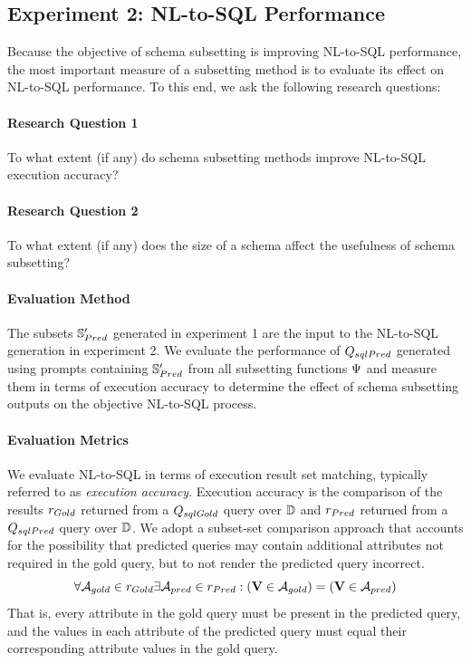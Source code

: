 \subsection{Experiment 2: NL-to-SQL Performance}

Because the objective of schema subsetting is improving NL-to-SQL performance, the most important measure of a subsetting method is to evaluate its effect on NL-to-SQL performance.
To this end, we ask the following research questions:

\paragraph{\textbf{Research Question 1}} To what extent (if any) do schema subsetting methods improve NL-to-SQL execution accuracy?

\paragraph{\textbf{Research Question 2}} To what extent (if any) does the size of a schema affect the usefulness of schema subsetting? 

\paragraph{\textbf{Evaluation Method}}
The subsets $\mathbb{S}'_{Pred}$ generated in experiment 1 are the input to the NL-to-SQL generation in experiment 2.
We evaluate the performance of $Q_{sqlPred}$ generated using prompts containing $\mathbb{S}'_{Pred}$ from all subsetting functions $\Psi$ and measure them in terms of execution accuracy to determine the effect of schema subsetting outputs on the objective NL-to-SQL process.

\paragraph{\textbf{Evaluation Metrics}} 

We evaluate NL-to-SQL in terms of execution result set matching, typically referred to as \emph{execution accuracy}.
Execution accuracy is the comparison of the results $r_{Gold}$ returned from a $Q_{sqlGold}$ query over $\mathbb{D}$ and $r_{Pred}$ returned from a $Q_{sqlPred}$ query over $\mathbb{D}$.
We adopt a subset-set comparison approach that accounts for the possibility that predicted queries may contain additional attributes not required in the gold query, but to not render the predicted query incorrect.
\begin{equation}
  \forall \mathcal{A}_{gold} \in r_{Gold} \exists \mathcal{A}_{pred} \in r_{Pred}: (\mathbf{V} \in \mathcal{A}_{gold}) = (\mathbf{V} \in \mathcal{A}_{pred})
\end{equation}
That is, every attribute in the gold query must be present in the predicted query, and the values in each attribute of the predicted query must equal their corresponding attribute values in the gold query.

